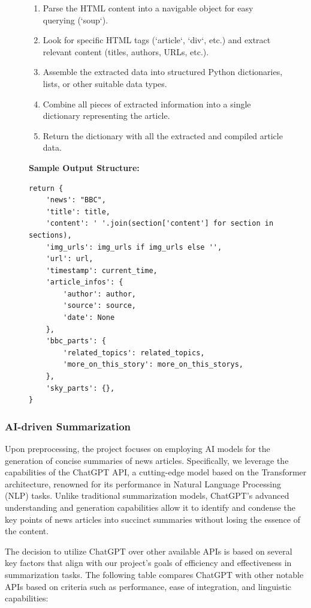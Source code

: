 \documentclass[10pt]{article}
\begin{document}
\begin{figure}[htbp]
\begin{minipage}[t]{0.6\textwidth}
    \begin{enumerate}
        \item Parse the HTML content into a navigable object for easy querying (`soup`).
        \item Look for specific HTML tags (`article`, `div`, etc.) and extract relevant content (titles, authors, URLs, etc.).
        \item Assemble the extracted data into structured Python dictionaries, lists, or other suitable data types.
        \item Combine all pieces of extracted information into a single dictionary representing the article.
        \item Return the dictionary with all the extracted and compiled article data.
    \end{enumerate}

    \textbf{Sample Output Structure:}
    \begin{lstlisting}
return {
    'news': "BBC",
    'title': title,
    'content': ' '.join(section['content'] for section in sections), 
    'img_urls': img_urls if img_urls else '', 
    'url': url,
    'timestamp': current_time,
    'article_infos': {
        'author': author,
        'source': source,
        'date': None
    },
    'bbc_parts': {
        'related_topics': related_topics,
        'more_on_this_story': more_on_this_storys,
    },
    'sky_parts': {}, 
}
    \end{lstlisting}
    \end{minipage}
\end{figure}

\newpage

\subsubsection{AI-driven Summarization}
Upon preprocessing, the project focuses on employing AI models for the generation of concise summaries of news articles. Specifically, we leverage the capabilities of the ChatGPT API, a cutting-edge model based on the Transformer architecture, renowned for its performance in Natural Language Processing (NLP) tasks. Unlike traditional summarization models, ChatGPT's advanced understanding and generation capabilities allow it to identify and condense the key points of news articles into succinct summaries without losing the essence of the content. 

The decision to utilize ChatGPT over other available APIs is based on several key factors that align with our project's goals of efficiency and effectiveness in summarization tasks. The following table compares ChatGPT with other notable APIs based on criteria such as performance, ease of integration, and linguistic capabilities:
\end{document}
